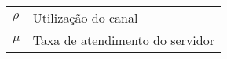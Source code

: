 \begin{tabular}{p{2cm}p{15cm}}

$\rho$ & Utilização do canal\\
$\mu$ & Taxa de atendimento do servidor\\ 

\end{tabular} 